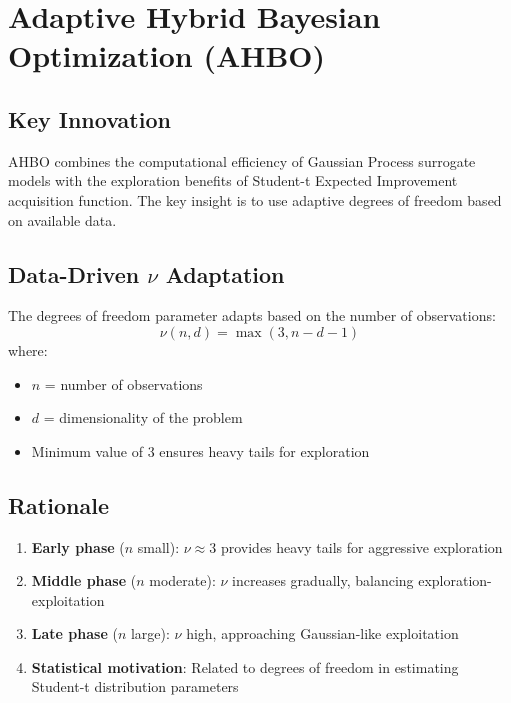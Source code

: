 \documentclass[11pt,a4paper]{article}
\begin{document}
\section{Adaptive Hybrid Bayesian Optimization (AHBO)}

\subsection{Key Innovation}

AHBO combines the computational efficiency of Gaussian Process surrogate models with the exploration benefits of Student-t Expected Improvement acquisition function. The key insight is to use adaptive degrees of freedom based on available data.

\subsection{Data-Driven $\nu$ Adaptation}

The degrees of freedom parameter adapts based on the number of observations:
\begin{equation}
    \nu(n, d) = \max(3, n - d - 1)
\end{equation}
where:
\begin{itemize}
    \item $n$ = number of observations
    \item $d$ = dimensionality of the problem
    \item Minimum value of 3 ensures heavy tails for exploration
\end{itemize}

\subsection{Rationale}

\begin{enumerate}
    \item \textbf{Early phase} ($n$ small): $\nu \approx 3$ provides heavy tails for aggressive exploration
    \item \textbf{Middle phase} ($n$ moderate): $\nu$ increases gradually, balancing exploration-exploitation
    \item \textbf{Late phase} ($n$ large): $\nu$ high, approaching Gaussian-like exploitation
    \item \textbf{Statistical motivation}: Related to degrees of freedom in estimating Student-t distribution parameters
\end{enumerate}
\end{document}
